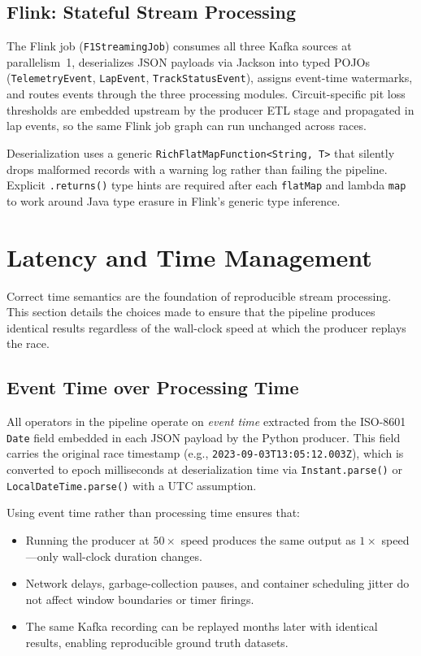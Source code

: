 \documentclass[a4paper,twocolumn]{article}
\begin{document}
\subsection{Flink: Stateful Stream Processing}

The Flink job (\texttt{F1StreamingJob}) consumes all three Kafka sources
at parallelism~1, deserializes JSON payloads via Jackson into typed POJOs
(\texttt{TelemetryEvent}, \texttt{LapEvent}, \texttt{TrackStatusEvent}),
assigns event-time watermarks, and routes events through the three
processing modules. Circuit-specific pit loss thresholds are embedded
upstream by the producer ETL stage and propagated in lap events, so the
same Flink job graph can run unchanged across races.

Deserialization uses a generic \texttt{RichFlatMapFunction<String,\,T>}
that silently drops malformed records with a warning log rather than
failing the pipeline. Explicit \texttt{.returns()} type hints are required
after each \texttt{flatMap} and lambda \texttt{map} to work around Java
type erasure in Flink's generic type inference.

\section{Latency and Time Management}

Correct time semantics are the foundation of reproducible stream
processing. This section details the choices made to ensure that the
pipeline produces identical results regardless of the wall-clock speed at
which the producer replays the race.

\subsection{Event Time over Processing Time}

All operators in the pipeline operate on \emph{event time} extracted from
the ISO-8601 \texttt{Date} field embedded in each JSON payload by the
Python producer. This field carries the original race timestamp (e.g.,
\texttt{2023-09-03T13:05:12.003Z}), which is converted to epoch
milliseconds at deserialization time via \texttt{Instant.parse()} or
\texttt{LocalDateTime.parse()} with a UTC assumption.

Using event time rather than processing time ensures that:
\begin{itemize}
  \item Running the producer at $50\times$ speed produces the same output
    as $1\times$ speed---only wall-clock duration changes.
  \item Network delays, garbage-collection pauses, and container
    scheduling jitter do not affect window boundaries or timer firings.
  \item The same Kafka recording can be replayed months later with
    identical results, enabling reproducible ground truth datasets.
\end{itemize}
\end{document}
